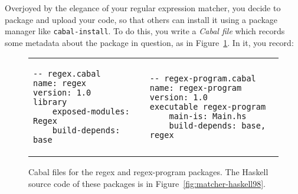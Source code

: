 
Overjoyed by the elegance of your regular expression matcher, you decide
to package and upload your code, so that others can install it
using a package manager like \verb|cabal-install|.  To
do this, you write a \emph{Cabal file} which records some metadata
about the package in question, as in Figure~\ref{fig:matcher-packages}.
In it, you record:

\begin{figure}
\begin{tabular}{p{} p{}}
\begin{lstlisting}[language=Cabal]
-- regex.cabal
name: regex
version: 1.0
library
    exposed-modules: Regex
    build-depends: base
\end{lstlisting}
&
\begin{lstlisting}[language=Cabal]
-- regex-program.cabal
name: regex-program
version: 1.0
executable regex-program
    main-is: Main.hs
    build-depends: base, regex
\end{lstlisting}
\end{tabular}
\caption{Cabal files for the regex and regex-program packages. The Haskell source code
of these packages is in Figure~\ref{fig:matcher-haskell98}.}
\label{fig:matcher-packages}
\end{figure}

